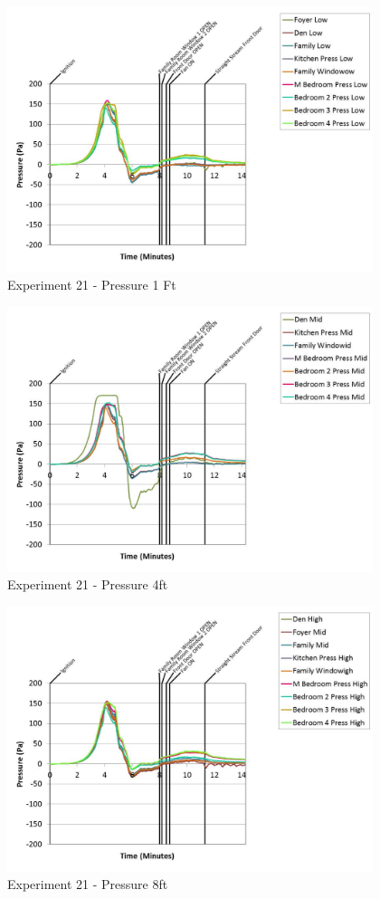 \documentclass{article}
\begin{document}
\begin{appendices}
	\clearpage

	\begin{figure}[h!]
		\centering
		\includegraphics[height=3.05in]{0_Images/Results_Charts/Exp_21_Charts/Pressure1Ft.pdf}
		\caption{Experiment 21 - Pressure 1 Ft}
	\end{figure}
 

	\begin{figure}[h!]
		\centering
		\includegraphics[height=3.05in]{0_Images/Results_Charts/Exp_21_Charts/Pressure4ft.pdf}
		\caption{Experiment 21 - Pressure 4ft}
	\end{figure}
 
	\clearpage

	\begin{figure}[h!]
		\centering
		\includegraphics[height=3.05in]{0_Images/Results_Charts/Exp_21_Charts/Pressure8ft.pdf}
		\caption{Experiment 21 - Pressure 8ft}
	\end{figure}
 


\end{appendices}
\end{document}
